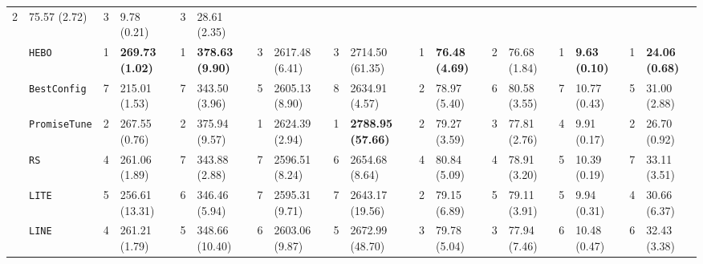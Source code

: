\begin{tabular}{clllllllllllllllll}
  2 &
  \multicolumn{1}{l|}{75.57 (2.72)} &
  3 &
  \multicolumn{1}{l|}{9.78 (0.21)} &
  3 &
  28.61 (2.35) \\
\multicolumn{1}{c|}{} &
  \multicolumn{1}{l|}{\texttt{HEBO}} &
  \cellcolor{blue!15}1 &
  \multicolumn{1}{l|}{\cellcolor{blue!15}\textbf{269.73 (1.02)}} &
  \cellcolor{blue!15}1 &
  \multicolumn{1}{l|}{\cellcolor{blue!15}\textbf{378.63 (9.90)}} &
  3 &
  \multicolumn{1}{l|}{2617.48 (6.41)} &
  3 &
  \multicolumn{1}{l|}{2714.50 (61.35)} &
  \cellcolor{blue!15}1 &
  \multicolumn{1}{l|}{\cellcolor{blue!15}\textbf{76.48 (4.69)}} &
  2 &
  \multicolumn{1}{l|}{76.68 (1.84)} &
  \cellcolor{blue!15}1 &
  \multicolumn{1}{l|}{\cellcolor{blue!15}\textbf{9.63 (0.10)}} &
  \cellcolor{blue!15}1 &
  \cellcolor{blue!15}\textbf{24.06 (0.68)} \\
\multicolumn{1}{c|}{} &
  \multicolumn{1}{l|}{\texttt{BestConfig}} &
  7 &
  \multicolumn{1}{l|}{215.01 (1.53)} &
  7 &
  \multicolumn{1}{l|}{343.50 (3.96)} &
  5 &
  \multicolumn{1}{l|}{2605.13 (8.90)} &
  8 &
  \multicolumn{1}{l|}{2634.91 (4.57)} &
  2 &
  \multicolumn{1}{l|}{78.97 (5.40)} &
  6 &
  \multicolumn{1}{l|}{80.58 (3.55)} &
  7 &
  \multicolumn{1}{l|}{10.77 (0.43)} &
  5 &
  31.00 (2.88) \\
\multicolumn{1}{c|}{} &
  \multicolumn{1}{l|}{\texttt{PromiseTune}} &
  2 &
  \multicolumn{1}{l|}{267.55 (0.76)} &
  2 &
  \multicolumn{1}{l|}{375.94 (9.57)} &
  \cellcolor{blue!15}1 &
  \multicolumn{1}{l|}{\cellcolor{blue!15}2624.39 (2.94)} &
  \cellcolor{blue!15}1 &
  \multicolumn{1}{l|}{\cellcolor{blue!15}\textbf{2788.95 (57.66)}} &
  2 &
  \multicolumn{1}{l|}{79.27 (3.59)} &
  3 &
  \multicolumn{1}{l|}{77.81 (2.76)} &
  4 &
  \multicolumn{1}{l|}{9.91 (0.17)} &
  2 &
  26.70 (0.92) \\
\multicolumn{1}{c|}{} &
  \multicolumn{1}{l|}{\texttt{RS}} &
  4 &
  \multicolumn{1}{l|}{261.06 (1.89)} &
  7 &
  \multicolumn{1}{l|}{343.88 (2.88)} &
  7 &
  \multicolumn{1}{l|}{2596.51 (8.24)} &
  6 &
  \multicolumn{1}{l|}{2654.68 (8.64)} &
  4 &
  \multicolumn{1}{l|}{80.84 (5.09)} &
  4 &
  \multicolumn{1}{l|}{78.91 (3.20)} &
  5 &
  \multicolumn{1}{l|}{10.39 (0.19)} &
  7 &
  33.11 (3.51) \\
\multicolumn{1}{c|}{} &
  \multicolumn{1}{l|}{\texttt{LITE}} &
  5 &
  \multicolumn{1}{l|}{256.61 (13.31)} &
  6 &
  \multicolumn{1}{l|}{346.46 (5.94)} &
  7 &
  \multicolumn{1}{l|}{2595.31 (9.71)} &
  7 &
  \multicolumn{1}{l|}{2643.17 (19.56)} &
  2 &
  \multicolumn{1}{l|}{79.15 (6.89)} &
  5 &
  \multicolumn{1}{l|}{79.11 (3.91)} &
  5 &
  \multicolumn{1}{l|}{9.94 (0.31)} &
  4 &
  30.66 (6.37) \\
\multicolumn{1}{c|}{} &
  \multicolumn{1}{l|}{\texttt{LINE}} &
  4 &
  \multicolumn{1}{l|}{261.21 (1.79)} &
  5 &
  \multicolumn{1}{l|}{348.66 (10.40)} &
  6 &
  \multicolumn{1}{l|}{2603.06 (9.87)} &
  5 &
  \multicolumn{1}{l|}{2672.99 (48.70)} &
  3 &
  \multicolumn{1}{l|}{79.78 (5.04)} &
  3 &
  \multicolumn{1}{l|}{77.94 (7.46)} &
  6 &
  \multicolumn{1}{l|}{10.48 (0.47)} &
  6 &
  32.43 (3.38) \\
\hline
\end{tabular}